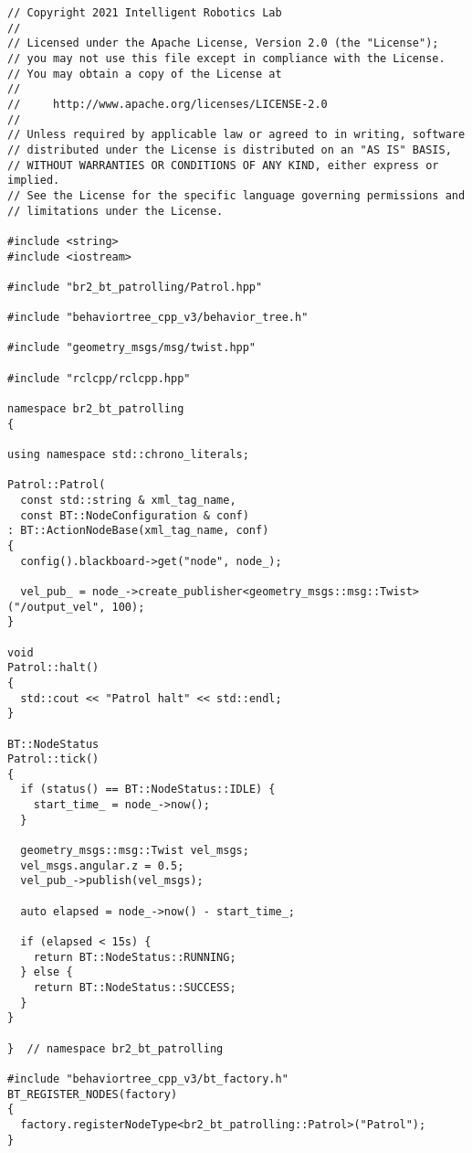 \footnotesize
\begin{tcolorbox}[sharp corners, colframe=gray!80, colback=LightGray, left=0pt, top=0pt, bottom=0pt, title=\texttt{br2\_bt\_patrolling/src/br2\_bt\_patrolling/Patrol.cpp}]
  \begin{verbatim}
// Copyright 2021 Intelligent Robotics Lab
//
// Licensed under the Apache License, Version 2.0 (the "License");
// you may not use this file except in compliance with the License.
// You may obtain a copy of the License at
//
//     http://www.apache.org/licenses/LICENSE-2.0
//
// Unless required by applicable law or agreed to in writing, software
// distributed under the License is distributed on an "AS IS" BASIS,
// WITHOUT WARRANTIES OR CONDITIONS OF ANY KIND, either express or implied.
// See the License for the specific language governing permissions and
// limitations under the License.

#include <string>
#include <iostream>

#include "br2_bt_patrolling/Patrol.hpp"

#include "behaviortree_cpp_v3/behavior_tree.h"

#include "geometry_msgs/msg/twist.hpp"

#include "rclcpp/rclcpp.hpp"

namespace br2_bt_patrolling
{

using namespace std::chrono_literals;

Patrol::Patrol(
  const std::string & xml_tag_name,
  const BT::NodeConfiguration & conf)
: BT::ActionNodeBase(xml_tag_name, conf)
{
  config().blackboard->get("node", node_);

  vel_pub_ = node_->create_publisher<geometry_msgs::msg::Twist>("/output_vel", 100);
}

void
Patrol::halt()
{
  std::cout << "Patrol halt" << std::endl;
}

BT::NodeStatus
Patrol::tick()
{
  if (status() == BT::NodeStatus::IDLE) {
    start_time_ = node_->now();
  }

  geometry_msgs::msg::Twist vel_msgs;
  vel_msgs.angular.z = 0.5;
  vel_pub_->publish(vel_msgs);

  auto elapsed = node_->now() - start_time_;

  if (elapsed < 15s) {
    return BT::NodeStatus::RUNNING;
  } else {
    return BT::NodeStatus::SUCCESS;
  }
}

}  // namespace br2_bt_patrolling

#include "behaviortree_cpp_v3/bt_factory.h"
BT_REGISTER_NODES(factory)
{
  factory.registerNodeType<br2_bt_patrolling::Patrol>("Patrol");
}
    \end{verbatim}
    \end{tcolorbox}
  \normalsize


